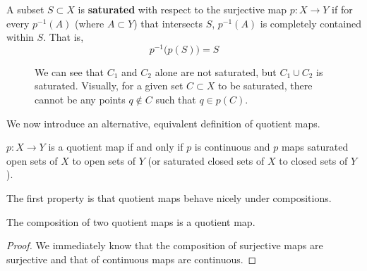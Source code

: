   \begin{definition}[Saturation]
    A subset $S \subset X$ is \textbf{saturated} with respect to the surjective map $p: X \rightarrow Y$ if for every $p^{-1} (A)$ (where $A \subset Y$) that intersects $S$, $p^{-1}(A)$ is completely contained within $S$. That is, 
    \begin{equation}
      p^{-1} \big( p(S) \big) = S
    \end{equation}

    \begin{figure}[H]
      \centering 
      \caption{We can see that $C_1$ and $C_2$ alone are not saturated, but $C_1 \cup C_2$ is saturated. Visually, for a given set $C \subset X$ to be saturated, there cannot be any points $q \not\in C$ such that $q \in p(C)$. }
      \label{fig:saturation}
    \end{figure}
  \end{definition}

  We now introduce an alternative, equivalent definition of quotient maps. 

  \begin{theorem}
    $p: X \rightarrow Y$ is a quotient map if and only if $p$ is continuous and $p$ maps saturated open sets of $X$ to open sets of $Y$ (or saturated closed sets of $X$ to closed sets of $Y$). 
  \end{theorem} 

  The first property is that quotient maps behave nicely under compositions. 

  \begin{theorem}
    The composition of two quotient maps is a quotient map. 
  \end{theorem}
  \begin{proof}
    We immediately know that the composition of surjective maps are surjective and that of continuous maps are continuous. 
  \end{proof}

